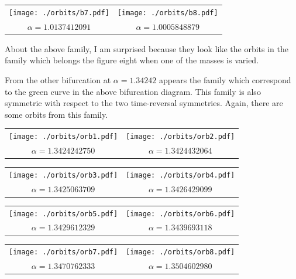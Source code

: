 \documentclass{article}
\begin{document}
\begin{tabular}{cc}
\texttt{[image: ./orbits/b7.pdf]}&
\texttt{[image: ./orbits/b8.pdf]}\\
$\alpha= 1.0137412091$&$ \alpha= 1.0005848879$
\end{tabular}

About the above family, I am surprised because they look like the orbits in the family which belongs the figure eight when one of the  masses is varied. 

From the other bifurcation  at $\alpha= 1.34242$ appears the family which correspond to the green curve in the above bifurcation diagram. This family is also symmetric with respect to the two time-reversal symmetries.  Again, there are some orbits from this family.

\begin{tabular}{cc}
\texttt{[image: ./orbits/orb1.pdf]}&
\texttt{[image: ./orbits/orb2.pdf]}\\
$\alpha=1.3424242750 $&$ \alpha=1.3424432064 $
\end{tabular}

\begin{tabular}{cc}
\texttt{[image: ./orbits/orb3.pdf]}&
\texttt{[image: ./orbits/orb4.pdf]}\\
$\alpha= 1.3425063709$&$ \alpha=1.3426429099 $
\end{tabular}

\begin{tabular}{cc}
\texttt{[image: ./orbits/orb5.pdf]}&
\texttt{[image: ./orbits/orb6.pdf]}\\
$\alpha=1.3429612329 $&$ \alpha=1.3439693118 $
\end{tabular}

\begin{tabular}{cc}
\texttt{[image: ./orbits/orb7.pdf]}&
\texttt{[image: ./orbits/orb8.pdf]}\\
$\alpha= 1.3470762333$&$ \alpha= 1.3504602980$
\end{tabular}
\end{document}
